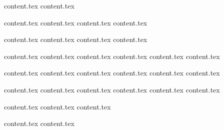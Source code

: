 \documentclass[letterpaper,11pt]{article}
\theoremstyle{mytheorem}
\begin{document}
\makeatletter
\renewcommand{\l@section}{\@dottedtocline{1}{0em}{5em}}
\makeatother

\thispagestyle{firststyle}
\tableofcontents \thispagestyle{firststyle} \clearpage \newpage

{content.tex} \clearpage\newpage
{content.tex} \clearpage\newpage

{content.tex} \clearpage\newpage
{content.tex} \clearpage\newpage
{content.tex} \clearpage\newpage
{content.tex} \clearpage\newpage

{content.tex} \clearpage\newpage
{content.tex} \clearpage\newpage
{content.tex} \clearpage\newpage
{content.tex} \clearpage\newpage

{content.tex} \clearpage\newpage
{content.tex} \clearpage\newpage
{content.tex} \clearpage\newpage
{content.tex} \clearpage\newpage
{content.tex} \clearpage\newpage
{content.tex} \clearpage\newpage

{content.tex} \clearpage\newpage
{content.tex} \clearpage\newpage
{content.tex} \clearpage\newpage
{content.tex} \clearpage\newpage
{content.tex} \clearpage\newpage
{content.tex} \clearpage\newpage

{content.tex} \clearpage\newpage
{content.tex} \clearpage\newpage
{content.tex} \clearpage\newpage
{content.tex} \clearpage\newpage
{content.tex} \clearpage\newpage
{content.tex} \clearpage\newpage

{content.tex} \clearpage\newpage
{content.tex} \clearpage\newpage
{content.tex} \clearpage\newpage

{content.tex} \clearpage\newpage
{content.tex} \clearpage\newpage
\end{document}
